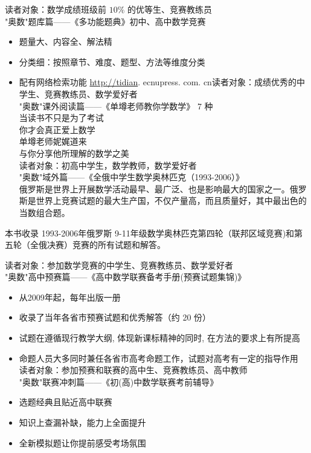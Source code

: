 \documentclass[10pt]{article}
\begin{document}
读者对象：数学成绩班级前 $10 \%$ 的优等生、竞赛教练员\\
"奥数"题库篇——《多功能题典》初中、高中数学竞赛

\begin{itemize}
  \item 题量大、内容全、解法精
  \item 分类细：按照章节、难度、题型、方法等维度分类
  \item 配有网络检索功能 \href{http://tidian}{http://tidian}. ecnupress. com. cn读者对象：成绩优秀的中学生、竞赛教练员、数学爱好者\\
"奥数"课外阅读篇——《单墫老师教你学数学》 7 种\\
当读书不只是为了考试\\
你才会真正爱上数学\\
单墫老师妮娓道来\\
与你分享他所理解的数学之美\\
读者对象：初高中学生，数学教师，数学爱好者\\
"奥数"域外篇——《全俄中学生数学奥林匹克（1993-2006）》\\
俄罗斯是世界上开展数学活动最早、最广泛、也是影响最大的国家之一。俄罗斯是世界上竞赛试题的最大生产国，不仅产量高，而且质量好，其中最出色的当数组合题。
\end{itemize}

本书收录 1993-2006年俄罗斯 9-11年级数学奥林匹克第四轮（联邦区域竞赛)和第五轮（全俄决赛）竞赛的所有试题和解答。

读者对象：参加数学竞赛的中学生、竞赛教练员、数学爱好者\\
"奥数"高中预赛篇——《高中数学联赛备考手册(预赛试题集锦)》

\begin{itemize}
  \item 从2009年起，每年出版一册
  \item 收录了当年各省市预赛试题和优秀解答（约 20 份）
  \item 试题在遵循现行教学大纲, 体现新课标精神的同时, 在方法的要求上有所提高
  \item 命题人员大多同时兼任各省市高考命题工作，试题对高考有一定的指导作用\\
读者对象：参加预赛和联赛的高中生、竞赛教练员、高中教师\\
"奥数"联赛冲刺篇——《初(高)中数学联赛考前辅导》
  \item 选题经典且贴近高中联赛
  \item 知识上查漏补缺，能力上全面提升
  \item 全新模拟题让你提前感受考场氛围
\end{itemize}
\end{document}
